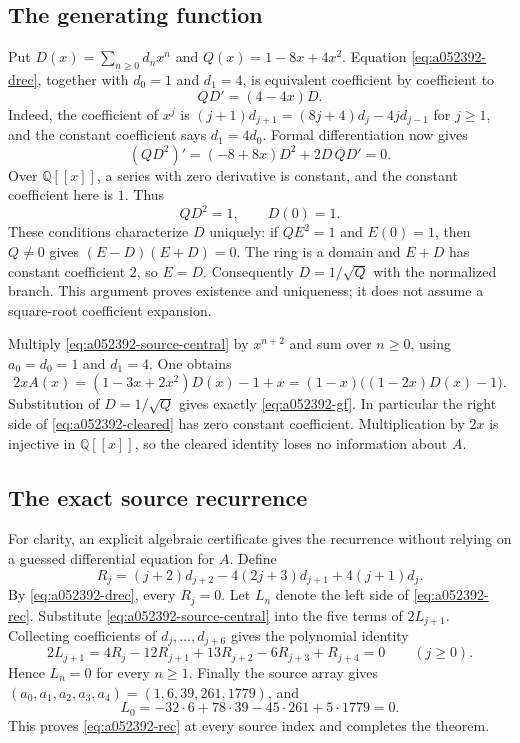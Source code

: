 \documentclass[11pt]{article}
\begin{document}
\subsection{The generating function}

Put $D(x)=\sum_{n\ge0}d_nx^n$ and $Q(x)=1-8x+4x^2$.
Equation \eqref{eq:a052392-drec}, together with $d_0=1$ and $d_1=4$,
is equivalent coefficient by coefficient to
\begin{equation}\label{eq:a052392-ode}
 QD'=(4-4x)D.
\end{equation}
Indeed, the coefficient of $x^j$ is
$(j+1)d_{j+1}=(8j+4)d_j-4jd_{j-1}$ for $j\ge1$,
and the constant coefficient says $d_1=4d_0$.
Formal differentiation now gives
\[
 (QD^2)'=(-8+8x)D^2+2D\,QD'=0.
\]
Over $\mathbb Q[[x]]$, a series with zero derivative is constant, and the
constant coefficient here is $1$. Thus
\begin{equation}\label{eq:a052392-square}
 QD^2=1,\qquad D(0)=1.
\end{equation}
These conditions characterize $D$ uniquely: if $QE^2=1$ and $E(0)=1$,
then $Q\ne0$ gives $(E-D)(E+D)=0$. The ring is a domain and $E+D$ has
constant coefficient $2$, so $E=D$. Consequently $D=1/\sqrt Q$ with
the normalized branch. This argument proves existence and uniqueness;
it does not assume a square-root coefficient expansion.

Multiply \eqref{eq:a052392-source-central} by $x^{n+2}$ and sum over
$n\ge0$, using $a_0=d_0=1$ and $d_1=4$. One obtains
\begin{equation}\label{eq:a052392-cleared}
 2xA(x)=(1-3x+2x^2)D(x)-1+x
       =(1-x)\bigl((1-2x)D(x)-1\bigr).
\end{equation}
Substitution of $D=1/\sqrt Q$ gives exactly
\eqref{eq:a052392-gf}. In particular the right side of
\eqref{eq:a052392-cleared} has zero constant coefficient. Multiplication
by $2x$ is injective in $\mathbb Q[[x]]$, so the cleared identity loses
no information about $A$.

\subsection{The exact source recurrence}

For clarity, an explicit algebraic certificate gives the recurrence
without relying on a guessed differential equation for $A$. Define
\[
 R_j=(j+2)d_{j+2}-4(2j+3)d_{j+1}+4(j+1)d_j.
\]
By \eqref{eq:a052392-drec}, every $R_j=0$.
Let $L_n$ denote the left side of \eqref{eq:a052392-rec}.
Substitute \eqref{eq:a052392-source-central} into the five terms of
$2L_{j+1}$. Collecting coefficients of $d_j,\ldots,d_{j+6}$ gives the
polynomial identity
\[
 2L_{j+1}=4R_j-12R_{j+1}+13R_{j+2}-6R_{j+3}+R_{j+4}=0
 \qquad(j\ge0).
\]
Hence $L_n=0$ for every $n\ge1$. Finally the source array gives
$(a_0,a_1,a_2,a_3,a_4)=(1,6,39,261,1779)$, and
\[
 L_0=-32\cdot6+78\cdot39-45\cdot261+5\cdot1779=0.
\]
This proves \eqref{eq:a052392-rec} at every source index and completes
the theorem.
\end{document}
